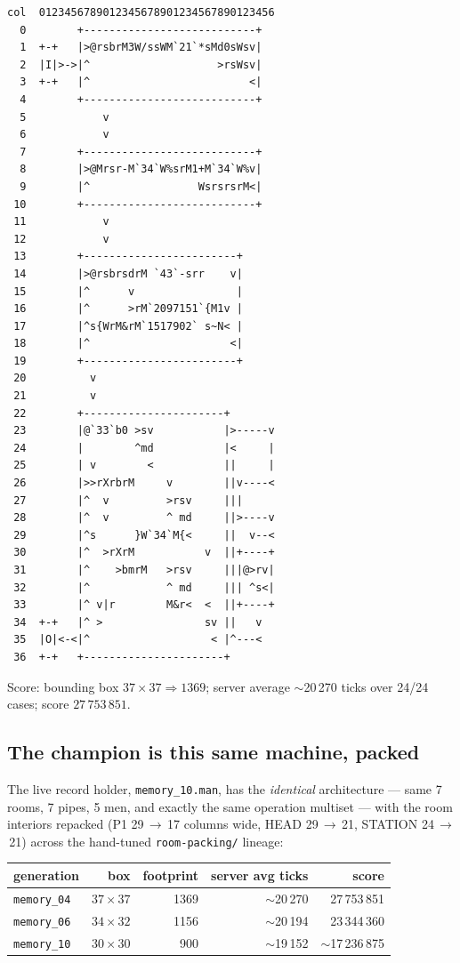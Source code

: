 \documentclass[11pt,a4paper]{article}
\begin{document}
{\footnotesize
\begin{verbatim}
col  0123456789012345678901234567890123456
  0        +---------------------------+
  1  +-+   |>@rsbrM3W/ssWM`21`*sMd0sWsv|
  2  |I|>->|^                    >rsWsv|
  3  +-+   |^                         <|
  4        +---------------------------+
  5            v
  6            v
  7        +---------------------------+
  8        |>@Mrsr-M`34`W%srM1+M`34`W%v|
  9        |^                 WsrsrsrM<|
 10        +---------------------------+
 11            v
 12            v
 13        +------------------------+
 14        |>@rsbrsdrM `43`-srr    v|
 15        |^      v                |
 16        |^      >rM`2097151`{M1v |
 17        |^s{WrM&rM`1517902` s~N< |
 18        |^                      <|
 19        +------------------------+
 20          v
 21          v
 22        +----------------------+
 23        |@`33`b0 >sv           |>-----v
 24        |        ^md           |<     |
 25        | v        <           ||     |
 26        |>>rXrbrM     v        ||v----<
 27        |^  v         >rsv     |||
 28        |^  v         ^ md     ||>----v
 29        |^s      }W`34`M{<     ||  v--<
 30        |^  >rXrM           v  ||+----+
 31        |^    >bmrM   >rsv     |||@>rv|
 32        |^            ^ md     ||| ^s<|
 33        |^ v|r        M&r<  <  ||+----+
 34  +-+   |^ >                sv ||   v
 35  |O|<-<|^                   < |^---<
 36  +-+   +----------------------+
\end{verbatim}
}

Score: bounding box $37\times37 \Rightarrow 1369$; server average
$\sim$20\,270 ticks over 24/24 cases; score $27\,753\,851$.

\subsection{The champion is this same machine, packed}
\label{sec:mem10}

The live record holder, \texttt{memory\_10.man}, has the \emph{identical}
architecture --- same 7 rooms, 7 pipes, 5 men, and exactly the same
operation multiset --- with the room interiors repacked (P1 29\,$\to$\,17
columns wide, HEAD 29\,$\to$\,21, STATION 24\,$\to$\,21) across the
hand-tuned \texttt{room-packing/} lineage:

\begin{center}
\begin{tabular}{lrrrr}
generation & box & footprint & server avg ticks & score\\ \hline
\texttt{memory\_04} & $37\times37$ & 1369 & $\sim$20\,270 & 27\,753\,851\\
\texttt{memory\_06} & $34\times32$ & 1156 & $\sim$20\,194 & 23\,344\,360\\
\texttt{memory\_10} & $30\times30$ & 900 & $\sim$19\,152 & $\sim$17\,236\,875\\
\end{tabular}
\end{center}
\end{document}
